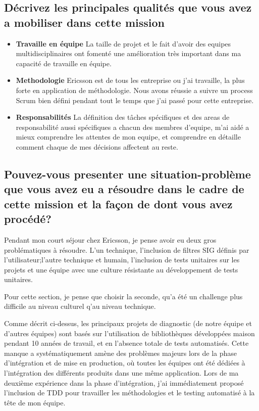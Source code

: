 \documentclass{resume} %
\begin{document}
			
\subsection{Décrivez les principales qualités que vous avez a mobiliser dans cette mission}
	
		\begin{itemize} 				
			\item \textbf{Travaille en équipe} \newline
				La taille de projet et le fait d'avoir des equipes multidisciplinaires ont fomenté une amélioration très important dans ma capacité de travaille en équipe. 
			\item \textbf{Methodologie} \newline
				Ericsson est de tous les entreprise ou j'ai travaille, la plus forte en application de méthodologie. Nous avons réussie a suivre un process Scrum bien défini pendant tout le temps que j'ai passé pour cette entreprise.  
			\item \textbf{Responsabilités  } \newline
				La définition des tâches spécifiques et des areas de responsabilité aussi spécifiques a chacun des membres  d'equipe, m'ai aidé a mieux comprendre les attentes de mon equipe, et comprendre en détaille comment chaque de mes décisions affectent au reste.  
		\end{itemize}
		
\subsection{Pouvez-vous presenter une situation-problème que vous avez eu a résoudre dans le cadre de cette mission et la façon de dont vous avez procédé?}

	Pendant mon court séjour chez Ericsson, je pense avoir eu deux gros problématiques à résoudre. L'un technique, l'inclusion de filtres SIG définis par l'utilisateur;l'autre technique et humain, l'inclusion de tests unitaires sur les projets et une équipe avec une culture résistante au développement de tests unitaires.
	
Pour cette section, je pense que choisir la seconde, qu'a été un challenge plus difficile au niveau culturel q'au niveau technique. 

Comme décrit ci-dessus, les principaux projets de diagnostic (de notre équipe et d'autres équipes) sont basés sur l'utilisation de bibliothèques développées maison pendant 10 années de travail, et en l'absence totale de tests automatisés.
Cette manque a systématiquement amène des problèmes majeurs lors de la phase d'intégration et de mise en production, où toutes les équipes ont été dédiées à l'intégration des différents produits dans une même application.
Lors de ma deuxième expérience dans la phase d'intégration, j'ai immédiatement proposé l'inclusion de TDD pour travailler les méthodologies et le testing automatisé à la tête de mon équipe.
\end{document}
